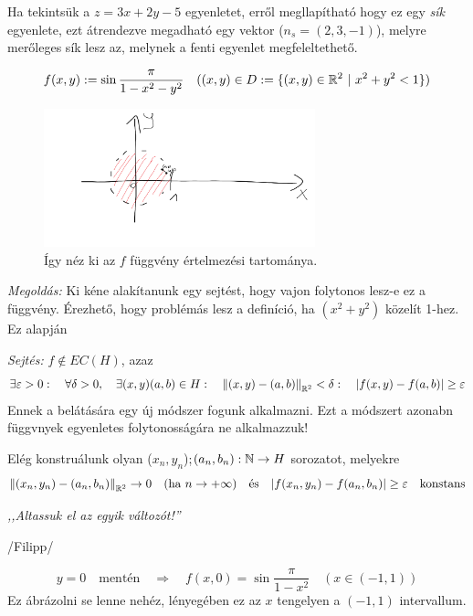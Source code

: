 \documentclass[a4paper,11.5pt]{article}
\newcommand{\norm}[1]{\left\lVert#1\right\rVert}
\begin{document}
	\begin{note}
		Ha tekintsük a $z=3x+2y-5$ egyenletet, erről megllapítható hogy ez egy \textit{sík} egyenlete, ezt átrendezve megadható egy vektor ($n_s=(2,3,-1)$), melyre merőleges sík lesz az, melynek a fenti egyenlet megfeleltethető.
	\end{note}
	\begin{task}
		\[ f(x,y):=\sin\frac{\pi}{1-x^2-y^2} \quad ((x,y)\in D:=\{ (x,y)\in\mathbb{R}^2 \ | \ x^2+y^2<1 \}) \]
		
		
		\begin{figure}[H]
			\centering
			\includegraphics[height=4cm]{kepek/53.png}
			\caption{Így néz ki az $f$ függvény értelmezési tartománya.}
		\end{figure}
		
		
		\textit{Megoldás:} Ki kéne alakítanunk egy sejtést, hogy vajon folytonos lesz-e ez a függvény. Érezhető, hogy problémás lesz a definíció, ha $(x^2+y^2)$ közelít 1-hez. Ez alapján
		
		\textit{Sejtés:} $f\notin EC(H)$, azaz
		\[ \exists\varepsilon>0:\quad \forall\delta>0,\quad \exists(x,y)(a,b)\in H:\quad \norm{(x,y)-(a,b)}_{\R^2}<\delta:\quad |f(x,y)-f(a,b)|\geq \varepsilon  \]
		Ennek a belátására egy új módszer fogunk alkalmazni. Ezt a módszert azonabn függvnyek egyenletes folytonosságára ne alkalmazzuk!
		
		Elég konstruálunk olyan ($x_n,y_n$);$(a_n,b_n):\mathbb{N}\to H$ sorozatot, melyekre
		\[ \norm{(x_n,y_n)-(a_n,b_n)}_{\R^2}\to0\quad (\text{ha } n\to+\infty)\quad \text{és}\quad |f(x_n,y_n)-f(a_n,b_n)|\geq \varepsilon\quad \text{konstans} \] 
		\begin{center}
			\textit{,,Altassuk el az egyik változót!''}
			
			/Filipp/
		\end{center}
		\[ y=0\quad \text{mentén}\quad \Rightarrow\quad f(x,0)=\sin\frac{\pi}{1-x^2}\quad (x\in(-1,1)) \]
		Ez ábrázolni se lenne nehéz, lényegében ez az $x$ tengelyen a $(-1,1)$ intervallum.
		

\end{task}
\end{document}
